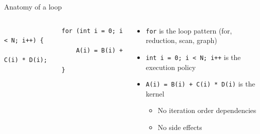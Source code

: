 \documentclass[
    aspectratio=169,
    handout,
]{beamer}
\begin{document}
\begin{frame}[fragile]{Anatomy of a loop}
    \begin{columns}
        \begin{column}{0.5\linewidth}
            \begin{verbatim}
                for (int i = 0; i < N; i++) {
                    A(i) = B(i) + C(i) * D(i);
                }
            \end{verbatim}
        \end{column}
        \begin{column}{0.5\linewidth}
            \begin{itemize}
                \item \texttt{for} is the loop pattern (for, reduction, scan, graph)
                \item \texttt{int i = 0; i < N; i++} is the execution policy
                \item \texttt{A(i) = B(i) + C(i) * D(i)} is the kernel
                \begin{itemize}
                    \item No iteration order dependencies
                    \item No side effects
                \end{itemize}
            \end{itemize}
        \end{column}
    \end{columns}
\end{frame}

\end{document}
